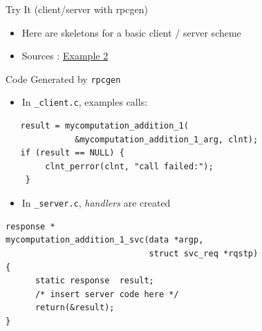 \documentclass[bigger,hyperref={colorlinks=true, urlcolor=red, plainpages=false, pdfpagelabels, bookmarksnumbered}]{beamer}
\begin{document}
\begin{frame}[label=sec-2-18]{Try It (client/server with rpcgen)}
\begin{itemize}
\item Here are skeletons for a basic client / server scheme
\item Sources : \href{http://icps.u-strasbg.fr/~genaud/courses/sd/src/rpc/example_2_rpcgen_incomplete.tar.gz}{Example 2}
\end{itemize}
\end{frame}

\begin{frame}[fragile,label=sec-2-19]{Code Generated by \texttt{rpcgen}}
 \begin{itemize}
\item In \texttt{\_client.c}, examples calls:
\end{itemize}
\lstset{language=C,label= ,caption= ,numbers=none}
\begin{lstlisting}
   result = mycomputation_addition_1(
              &mycomputation_addition_1_arg, clnt);
   if (result == NULL) {
        clnt_perror(clnt, "call failed:");
    }
\end{lstlisting}

\begin{itemize}
\item In \texttt{\_server.c}, \emph{handlers} are created
\end{itemize}
\lstset{language=C,label= ,caption= ,numbers=none}
\begin{lstlisting}
response *
mycomputation_addition_1_svc(data *argp,
                             struct svc_req *rqstp)
{
      static response  result;
      /* insert server code here */
      return(&result);
}
\end{lstlisting}
\end{frame}
\end{document}
